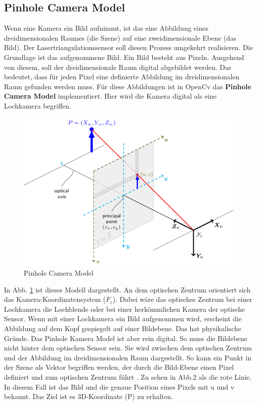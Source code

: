 	\subsection{Pinhole Camera Model}
	Wenn eine Kamera ein Bild aufnimmt, ist das eine Abbildung eines dreidimensionalen Raumes (die Szene) auf eine zweidimensionale Ebene (das Bild). Der Lasertriangulationssensor soll diesen Prozess umgekehrt realisieren. Die Grundlage ist das aufgenommene Bild. Ein Bild besteht aus Pixeln. Ausgehend von diesem, soll der dreidimensionale Raum digital abgebildet werden. Das bedeutet, dass für jeden Pixel eine definierte Abbildung im dreidimensionalen Raum gefunden werden muss. Für diese Abbildungen ist in OpenCv das \textbf{Pinhole Camera Model} implementiert. Hier wird die Kamera digital als eine Lochkamera begriffen. \newline
	\begin{figure}[h]
		\centering
		\includegraphics[width=0.7\linewidth]{img/grundlagen/pinhole_camera_model.png}
		\caption{Pinhole Camera Model}
		\label{fig:pinhole-camera-model}
	\end{figure}
	In Abb. \ref{fig:pinhole-camera-model} ist dieses Modell dargestellt. An dem optischen Zentrum orientiert sich das Kamera-Koordinatensystem (\( F_c \)). Dabei wäre das optisches Zentrum bei einer Lochkamera die Lochblende oder bei einer herkömmlichen Kamera der optische Sensor. Wenn mit einer Lochkamera ein Bild aufgenommen wird, erscheint die Abbildung auf dem Kopf gespiegelt auf einer Bildebene. Das hat physikalische Gründe. Das Pinhole Kamera Model ist aber rein digital. So muss die Bildebene nicht hinter dem optischen Sensor sein. Sie wird zwischen dem optischen Zentrum und der Abbildung im dreidimensionalen Raum dargestellt. So kann ein Punkt in der Szene als Vektor begriffen werden, der durch die Bild-Ebene einen Pixel definiert und zum optischen Zentrum führt \citep[Vgl.][]{dawson-howe_simple_1994}. Zu sehen in Abb.2 als die rote Linie. In diesem Fall ist das Bild und die genaue Position eines Pixels mit u und v bekannt. Das Ziel ist es 3D-Koordinate (P) zu erhalten.
	\newpage 
	
